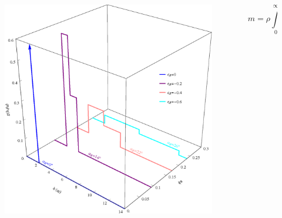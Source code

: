 \documentclass[aspectratio=169,11pt]{beamer}
\begin{document}
{
\begin{frame}[t,fragile]

\begin{columns} %
\begin{column}{0.5\textwidth}
\begin{figure}[h]
\includegraphics[width=\textwidth,height=0.8\textheight,keepaspectratio]{Figures/single_ridge_redistribution.eps}
\end{figure}
\end{column}
\begin{column}{.5\textwidth}
\centering
\color{white}
\Large
\begin{equation*}
m=\rho \int\limits_0^\infty g(h)\; h\; dh
\end{equation*}
\end{column}
\end{columns}
\end{frame}
}
\end{document}
